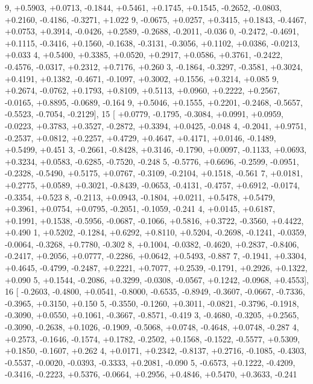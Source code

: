 \begin{DoxyCode}
      9, +0.5903, +0.0713, -0.1844, +0.5461, +0.1745, +0.1545, -0.2652, -0.0803, +0.2160, -0.4186, -0.3271, +1.022
      9, -0.0675, +0.0257, +0.3415, +0.1843, -0.4467, +0.0753, +0.3914, -0.0426, +0.2589, -0.2688, -0.2011, -0.036
      0, -0.2472, -0.4691, +0.1115, -0.3416, +0.1560, -0.1638, -0.3131, -0.3056, +0.1102, +0.0386, -0.0213, +0.033
      4, +0.5400, +0.3385, +0.0520, +0.2917, +0.0586, +0.3761, -0.2422, -0.4576, -0.0317, +0.2312, +0.7176, +0.260
      3, -0.1864, -0.3297, -0.3581, +0.3024, +0.4191, +0.1382, -0.4671, -0.1097, +0.3002, +0.1556, +0.3214, +0.085
      9, +0.2674, -0.0762, +0.1793, +0.8109, +0.5113, +0.0960, +0.2222, +0.2567, -0.0165, +0.8895, -0.0689, -0.164
      9, +0.5046, +0.1555, +0.2201, -0.2468, -0.5657, -0.5523, -0.7054, -0.2129],
15 [ +0.0779, -0.1795, -0.3084, +0.0991, +0.0959, -0.0223, +0.3783, +0.3527, -0.2872, +0.3394, +0.0425, -0.048
      4, -0.2041, +0.9751, -0.2537, +0.0812, +0.2257, +0.4729, +0.4647, +0.4171, +0.0146, -0.1489, +0.5499, +0.451
      3, -0.2661, -0.8428, +0.3146, -0.1790, +0.0097, -0.1133, +0.0693, +0.3234, +0.0583, -0.6285, -0.7520, -0.248
      5, -0.5776, +0.6696, -0.2599, -0.0951, -0.2328, -0.5490, +0.5175, +0.0767, -0.3109, -0.2104, +0.1518, -0.561
      7, +0.0181, +0.2775, +0.0589, +0.3021, -0.8439, -0.0653, -0.4131, -0.4757, +0.6912, -0.0174, -0.3354, +0.523
      8, -0.2113, +0.0943, -0.1804, +0.0211, +0.5478, +0.5479, +0.3961, +0.0754, +0.0795, -0.2051, -0.1059, -0.241
      4, +0.0145, +0.6187, +0.1991, +0.1538, -0.5956, -0.0687, -0.1066, +0.5816, +0.3722, -0.3560, +0.4422, +0.490
      1, +0.5202, -0.1284, +0.6292, +0.8110, +0.5204, -0.2698, -0.1241, -0.0359, -0.0064, -0.3268, +0.7780, -0.302
      8, +0.1004, -0.0382, -0.4620, +0.2837, -0.8406, -0.2417, +0.2056, +0.0777, -0.2286, +0.0642, +0.5493, -0.887
      7, -0.1941, +0.3304, +0.4645, -0.4799, -0.2487, +0.2221, +0.7077, +0.2539, -0.1791, +0.2926, +0.1322, +0.090
      5, +0.1544, -0.2086, +0.3299, -0.0308, -0.0567, +0.1242, -0.0968, +0.4553],
16 [ -0.2603, -0.4800, +0.0541, -0.8000, -0.6535, -0.8949, -0.3607, -0.0667, -0.7336, -0.3965, +0.3150, +0.150
      5, -0.3550, -0.1260, +0.3011, -0.0821, -0.3796, -0.1918, -0.3090, +0.0550, +0.1061, -0.3667, -0.8571, -0.419
      3, -0.4680, -0.3205, +0.2565, -0.3090, -0.2638, +0.1026, -0.1909, -0.5068, +0.0748, -0.4648, +0.0748, -0.287
      4, +0.2573, -0.1646, -0.1574, +0.1782, -0.2502, +0.1568, -0.1522, -0.5577, +0.5309, +0.1850, -0.1607, +0.262
      4, +0.0171, +0.2342, -0.8137, +0.2716, -0.1085, -0.4303, -0.5537, -0.0020, -0.0393, -0.3333, +0.2081, -0.090
      5, -0.6573, +0.1222, -0.4209, -0.3416, -0.2223, +0.5376, -0.0664, +0.2956, +0.4846, +0.5470, +0.3633, -0.241

\end{DoxyCode}
